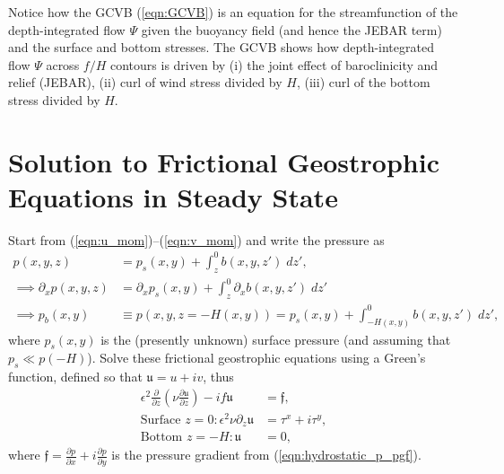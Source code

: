\documentclass[10pt]{amsart}
\begin{document}
Notice how the GCVB (\ref{eqn:GCVB}) is an equation for the streamfunction of the depth-integrated flow $\Psi$ given the buoyancy field (and hence the JEBAR term) and the surface and bottom stresses.
The GCVB shows how depth-integrated flow $\Psi$ across $f/H$ contours is driven by (i) the joint effect of baroclinicity and relief (JEBAR), (ii) curl of wind stress divided by $H$, (iii) curl of the bottom stress divided by $H$.
%

\section{Solution to Frictional Geostrophic Equations in Steady State}
Start from (\ref{eqn:u_mom})--(\ref{eqn:v_mom}) and write the pressure as
\begin{align}
p(x,y,z) & = p_s(x,y) + \int_{z}^{0} b(x,y,z') \; dz' , \label{eqn:hydrostatic_p} \\
\implies \partial_x p(x,y,z) & = \partial_x p_s (x, y) + \int_{z}^{0} \partial_x b(x,y,z') \; dz'  \label{eqn:hydrostatic_p_pgf} \\
\implies p_b(x, y) & \equiv p(x, y, z=-H(x,y)) = p_s(x,y) + \int_{-H(x,y)}^{0} b(x,y,z') \; dz' ,
\end{align}
where $p_s(x,y)$ is the (presently unknown) surface pressure (and assuming that $p_s \ll p(-H)$).
Solve these frictional geostrophic equations using a Green's function, defined so that $\mathfrak{u} = u + i v$, thus
\begin{align}
\epsilon^2 \frac{\partial}{\partial z} \left( \nu  \frac{\partial \mathfrak{u}}{\partial z} \right)  - i f  \mathfrak{u} & = \mathfrak{f} ,  \\
\text{Surface~}z = 0:
\epsilon^2 \nu \partial_z \mathfrak{u} & = \tau^x + i \tau^y , \label{eqn:sfc_bcs}
 \\
\text{Bottom~}z = -H:
\mathfrak{u} & = 0 ,
\end{align}
where $\mathfrak{f} = \frac{\partial p}{\partial x} +  i \frac{\partial p}{\partial y}$ is the pressure gradient from (\ref{eqn:hydrostatic_p_pgf}).
\end{document}
